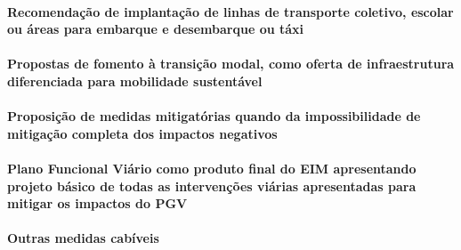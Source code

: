 \documentclass[]{article}
\let\oldparagraph\paragraph
\renewcommand{\paragraph}[1]{\oldparagraph{#1}\mbox{}}
\begin{document}
\hypertarget{recomendauxe7uxe3o-de-implantauxe7uxe3o-de-linhas-de-transporte-coletivo-escolar-ou-uxe1reas-para-embarque-e-desembarque-ou-tuxe1xi}{%
\paragraph{Recomendação de implantação de linhas de transporte coletivo,
escolar ou áreas para embarque e desembarque ou
táxi}\label{recomendauxe7uxe3o-de-implantauxe7uxe3o-de-linhas-de-transporte-coletivo-escolar-ou-uxe1reas-para-embarque-e-desembarque-ou-tuxe1xi}}

\hypertarget{propostas-de-fomento-uxe0-transiuxe7uxe3o-modal-como-oferta-de-infraestrutura-diferenciada-para-mobilidade-sustentuxe1vel}{%
\paragraph{Propostas de fomento à transição modal, como oferta de
infraestrutura diferenciada para mobilidade
sustentável}\label{propostas-de-fomento-uxe0-transiuxe7uxe3o-modal-como-oferta-de-infraestrutura-diferenciada-para-mobilidade-sustentuxe1vel}}

\hypertarget{proposiuxe7uxe3o-de-medidas-mitigatuxf3rias-quando-da-impossibilidade-de-mitigauxe7uxe3o-completa-dos-impactos-negativos}{%
\paragraph{Proposição de medidas mitigatórias quando da impossibilidade
de mitigação completa dos impactos
negativos}\label{proposiuxe7uxe3o-de-medidas-mitigatuxf3rias-quando-da-impossibilidade-de-mitigauxe7uxe3o-completa-dos-impactos-negativos}}

\hypertarget{plano-funcional-viuxe1rio-como-produto-final-do-eim-apresentando-projeto-buxe1sico-de-todas-as-intervenuxe7uxf5es-viuxe1rias-apresentadas-para-mitigar-os-impactos-do-pgv}{%
\paragraph{Plano Funcional Viário como produto final do EIM apresentando
projeto básico de todas as intervenções viárias apresentadas para
mitigar os impactos do
PGV}\label{plano-funcional-viuxe1rio-como-produto-final-do-eim-apresentando-projeto-buxe1sico-de-todas-as-intervenuxe7uxf5es-viuxe1rias-apresentadas-para-mitigar-os-impactos-do-pgv}}

\hypertarget{outras-medidas-cabuxedveis}{%
\paragraph{Outras medidas cabíveis}\label{outras-medidas-cabuxedveis}}
\end{document}
